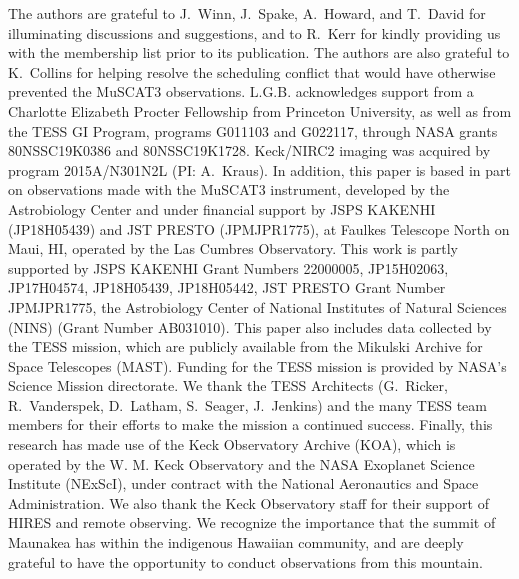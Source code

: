 \documentclass[12pt,modern,twocolumn,tighten]{aastex63}
\begin{document}
The authors are grateful to J{.}~Winn, J{.}~Spake, A{.}~Howard, and
T{.}~David for illuminating discussions and suggestions, and to
R{.}~Kerr for kindly providing us with the \citet{Kerr2021} membership
list prior to its publication.
The authors are also grateful to K{.}~Collins for helping resolve the
scheduling conflict that would have otherwise prevented the MuSCAT3
observations.
%
L.G.B{.} acknowledges support from a Charlotte Elizabeth Procter
Fellowship from Princeton University, as well as from the TESS GI
Program, programs G011103 and G022117, through NASA grants
80NSSC19K0386 and 80NSSC19K1728.
%
%
Keck/NIRC2 imaging was acquired by program 2015A/N301N2L
(PI: A.~Kraus). %
%
In addition, this paper is based in part on observations made with the
MuSCAT3 instrument, developed by the Astrobiology Center and under
financial support by JSPS KAKENHI (JP18H05439) and JST PRESTO
(JPMJPR1775), at Faulkes Telescope North on Maui, HI, operated by the
Las Cumbres Observatory.
%
This work is partly supported by JSPS KAKENHI Grant Numbers 22000005,
JP15H02063, JP17H04574, JP18H05439, JP18H05442, JST PRESTO Grant
Number JPMJPR1775, the Astrobiology Center of National Institutes of
Natural Sciences (NINS) (Grant Number AB031010).
%
%
This paper also includes data collected by the TESS mission, which are
publicly available from the Mikulski Archive for Space Telescopes
(MAST).
%
Funding for the TESS mission is provided by NASA's Science Mission
directorate.
%
We thank the TESS Architects (G.~Ricker, R.~Vanderspek, D.~Latham,
S.~Seager, J.~Jenkins) and the many TESS team members for their
efforts to make the mission a continued success.
%
%
%
%
Finally, this research has made use of the Keck Observatory Archive (KOA),
which is operated by the W. M. Keck Observatory and the NASA Exoplanet
Science Institute (NExScI), under contract with the National
Aeronautics and Space Administration.  We also thank the Keck
Observatory staff for their support of HIRES and remote observing.  We
recognize the importance that the summit of Maunakea has within the
indigenous Hawaiian community, and are deeply grateful to have the
opportunity to conduct observations from this mountain.
%
%
\end{document}
